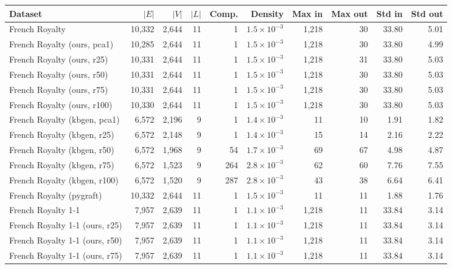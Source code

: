 \begin{tabular}{lrrrrrrrrr}
\toprule
Dataset & $|E|$ & $|V|$ & $|L|$ & Comp. & Density & Max in & Max out & Std in & Std out \\
\midrule
French Royalty & 10{,}332 & 2{,}644 & 11 & 1 & $1.5\times10^{-3}$ & 1{,}218 & 30 & 33.80 & 5.01 \\
French Royalty (ours, pca1) & 10{,}285 & 2{,}644 & 11 & 1 & $1.5\times10^{-3}$ & 1{,}218 & 30 & 33.80 & 4.99 \\
French Royalty (ours, r25) & 10{,}331 & 2{,}644 & 11 & 1 & $1.5\times10^{-3}$ & 1{,}218 & 31 & 33.80 & 5.03 \\
French Royalty (ours, r50) & 10{,}331 & 2{,}644 & 11 & 1 & $1.5\times10^{-3}$ & 1{,}218 & 30 & 33.80 & 5.03 \\
French Royalty (ours, r75) & 10{,}331 & 2{,}644 & 11 & 1 & $1.5\times10^{-3}$ & 1{,}218 & 30 & 33.80 & 5.03 \\
French Royalty (ours, r100) & 10{,}330 & 2{,}644 & 11 & 1 & $1.5\times10^{-3}$ & 1{,}218 & 30 & 33.80 & 5.03 \\
French Royalty (kbgen, pca1) & 6{,}572 & 2{,}196 & 9 & 1 & $1.4\times10^{-3}$ & 11 & 10 & 1.91 & 1.82 \\
French Royalty (kbgen, r25) & 6{,}572 & 2{,}148 & 9 & 1 & $1.4\times10^{-3}$ & 15 & 14 & 2.16 & 2.22 \\
French Royalty (kbgen, r50) & 6{,}572 & 1{,}968 & 9 & 54 & $1.7\times10^{-3}$ & 69 & 67 & 4.98 & 4.87 \\
French Royalty (kbgen, r75) & 6{,}572 & 1{,}523 & 9 & 264 & $2.8\times10^{-3}$ & 62 & 60 & 7.76 & 7.55 \\
French Royalty (kbgen, r100) & 6{,}572 & 1{,}520 & 9 & 287 & $2.8\times10^{-3}$ & 43 & 38 & 6.64 & 6.41 \\
French Royalty (pygraft) & 10{,}332 & 2{,}644 & 11 & 1 & $1.5\times10^{-3}$ & 11 & 11 & 1.88 & 1.76 \\
\midrule
French Royalty 1-1 & 7{,}957 & 2{,}639 & 11 & 1 & $1.1\times10^{-3}$ & 1{,}218 & 11 & 33.84 & 3.14 \\
French Royalty 1-1 (ours, r25) & 7{,}957 & 2{,}639 & 11 & 1 & $1.1\times10^{-3}$ & 1{,}218 & 11 & 33.84 & 3.14 \\
French Royalty 1-1 (ours, r50) & 7{,}957 & 2{,}639 & 11 & 1 & $1.1\times10^{-3}$ & 1{,}218 & 11 & 33.84 & 3.14 \\
French Royalty 1-1 (ours, r75) & 7{,}957 & 2{,}639 & 11 & 1 & $1.1\times10^{-3}$ & 1{,}218 & 11 & 33.84 & 3.14 \\

\end{tabular}
